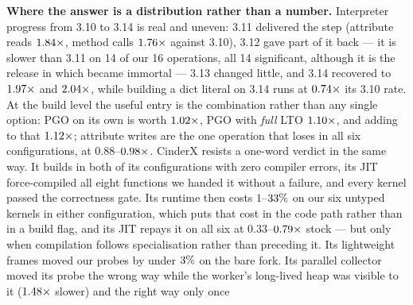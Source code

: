 \textbf{Where the answer is a distribution rather than a number.} Interpreter progress from
3.10 to 3.14 is real and uneven: 3.11 delivered the step (attribute reads $\meas{ratio:b3_runtime-v310:attr_get/v310|b3_runtime-v311:attr_get/v311}{1.84}\times$, method
calls $\meas{ratio:b3_runtime-v310:method_call/v310|b3_runtime-v311:method_call/v311}{1.76}\times$ against 3.10), 3.12 gave part of it back --- it is slower than 3.11 on 14 of
our 16 operations, all 14 significant, although it is the release in which  became
immortal --- 3.13 changed little, and 3.14 recovered to $\meas{ratio:b3_runtime-v310:attr_get/v310|b3_runtime-v314:attr_get/v314}{1.97}\times$ and $\meas{ratio:b3_runtime-v310:method_call/v310|b3_runtime-v314:method_call/v314}{2.04}\times$, while
building a dict literal on 3.14 runs at $\meas{ratio:b3_runtime-v310:create_dict/v310|b3_runtime-v314:create_dict/v314}{0.74}\times$ its 3.10 rate. At the build level the
useful entry is the combination rather than any single option: PGO on its own is worth
$\meas{geomean:b5_buildcfg-plain|b5_buildcfg-pgo}{1.02}\times$, PGO with \emph{full} LTO $\meas{geomean:b5_buildcfg-plain|b5_buildcfg-pgo_ltofull}{1.10}\times$, and adding  to that
$\meas{geomean:b5_buildcfg-plain|b5_buildcfg-pgo_ltofull_native}{1.12}\times$; attribute writes are the one operation that loses in all six configurations, at
$0.88$--$\meas{ratio:b5_buildcfg-plain:attr_set/plain|b5_buildcfg-pgo:attr_set/pgo}{0.98}\times$. CinderX resists a one-word verdict in the same way. It builds in both of
its configurations with zero compiler errors, its JIT force-compiled all eight functions we
handed it without a failure, and every kernel passed the correctness gate. Its runtime then
costs $1$--$\meas{pct:b6_cinderx-fork_cinderx:mandelbrot/fork_cinderx|b6_cinderx-stock:mandelbrot/stock}{33}\%$ on our six untyped kernels in either configuration, which puts that cost in
the code path rather than in a build flag, and its JIT repays it on all six at
$0.33$--$\meas{ratio:b6_cinderx-fork_jit:binarytrees/fork_jit|b6_cinderx-stock:binarytrees/stock}{0.79}\times$ stock --- but only when compilation follows specialisation rather than
preceding it. Its lightweight frames moved our probes by under $\meas{pct:b6_cinderx-stock:traceback_depth_50/stock|b6_cinderx-fork:traceback_depth_50/fork}{3}\%$ on the bare
fork. Its parallel collector moved its probe the wrong way while the worker's long-lived heap
was visible to it ($\meas{ratio:b6_gcscale-fork_cinderx:gc_collect/fork_cinderx/state_visible_par6|b6_gcscale-fork_cinderx:gc_collect/fork_cinderx/state_visible_serial}{1.48}\times$ slower) and the right way only once 
